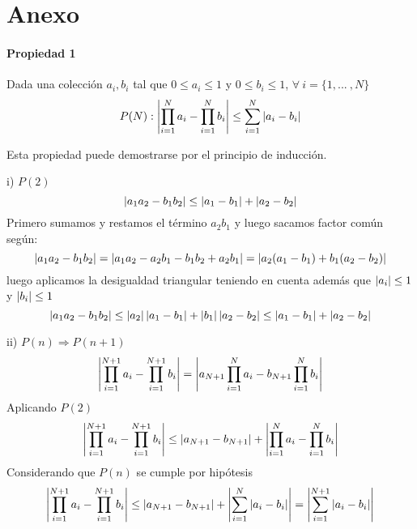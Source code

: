 \section{Anexo}

\paragraph{Propiedad 1}
 Dada una colección $a_i,b_i$ tal que $0\leq a_i\leq 1$ y $0 \leq b_i \leq 1$, $\forall \ i = \{1, ... \ , N\}$ 
\begin{equation}
    P(N) : \left|\prod_{i=1}^N a_i - \prod_{i=1}^N b_i\right| \leq \sum_{i=1}^N \left|a_i - b_i\right|
\end{equation}

Esta propiedad puede demostrarse por el principio de inducción.

i) $P(2)$
\begin{equation}
   \left|a_1 a_2 - b_1 b_2 \right| \leq \left|a_1 - b_1\right| + \left|a_2 - b_2\right|
\end{equation}
Primero sumamos y restamos el término $a_2 b_1$ y luego sacamos factor común según:
\begin{equation*}
    \left|a_1 a_2 - b_1 b_2\right| = \left|a_1 a_2 - a_2 b_1 - b_1 b_2 + a_2 b_1\right| =  \left|a_2 (a_1-b_1) + b_1 (a_2-b_2)\right| 
\end{equation*}
luego aplicamos la desigualdad triangular teniendo en cuenta además que $\left|a_i\right|\leq 1$ y $\left|b_i\right| \leq 1$
\begin{equation}
    \left|a_1 a_2 - b_1 b_2\right| \leq \left|a_2\right| \left|a_1-b_1\right|+\left|b_1\right|\left|a_2-b_2\right| \leq \left|a_1-b_1\right|+\left|a_2-b_2\right|
\end{equation}

ii) $P(n) \Rightarrow P(n+1)$
\begin{equation}
    \left|\prod_{i=1}^{N+1} a_i -\prod_{i=1}^{N+1} b_i  \right|  =  \left|a_{N+1} \prod_{i=1}^{N} a_i - b_{N+1} \prod_{i=1}^{N} b_i \right| 
\end{equation}
Aplicando $P(2)$
\begin{equation}
\left|\prod_{i=1}^{N+1} a_i -\prod_{i=1}^{N+1} b_i  \right|  \leq \left|a_{N+1}-b_{N+1}\right| + \left|\prod_{i=1}^{N} a_i - \prod_{i=1}^{N} b_i\right| 
\end{equation}
Considerando que $P(n)$ se cumple por hipótesis
\begin{equation}
\left|\prod_{i=1}^{N+1} a_i -\prod_{i=1}^{N+1} b_i  \right|  \leq \left|a_{N+1}-b_{N+1}\right| + \left|\sum_{i=1}^{N} \left|a_i - b_i\right|\right| =  \left|\sum_{i=1}^{N+1} \left|a_i - b_i\right|\right|
\end{equation}










